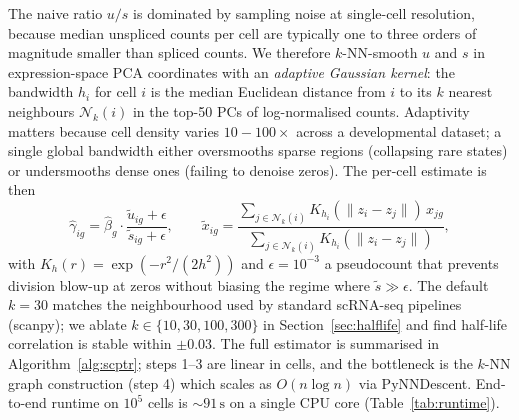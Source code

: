\documentclass{article}
\begin{document}
The naive ratio $u/s$ is dominated by sampling noise at single-cell resolution, because median unspliced counts per cell are typically one to three orders of magnitude smaller than spliced counts. We therefore $k$-NN-smooth $u$ and $s$ in expression-space PCA coordinates with an \textit{adaptive Gaussian kernel}: the bandwidth $h_i$ for cell $i$ is the median Euclidean distance from $i$ to its $k$ nearest neighbours $\mathcal{N}_k(i)$ in the top-50 PCs of log-normalised counts. Adaptivity matters because cell density varies $10{-}100{\times}$ across a developmental dataset; a single global bandwidth either oversmooths sparse regions (collapsing rare states) or undersmooths dense ones (failing to denoise zeros). The per-cell estimate is then
\begin{equation}
  \widehat{\gamma}_{ig} = \widehat{\beta}_g \cdot \frac{\widetilde{u}_{ig} + \epsilon}{\widetilde{s}_{ig} + \epsilon}, \qquad \widetilde{x}_{ig} = \frac{\sum_{j \in \mathcal{N}_k(i)} K_{h_i}(\|z_i - z_j\|)\, x_{jg}}{\sum_{j \in \mathcal{N}_k(i)} K_{h_i}(\|z_i - z_j\|)},
  \label{eq:gamma}
\end{equation}
with $K_h(r){=}\exp(-r^2/(2h^2))$ and $\epsilon{=}10^{-3}$ a pseudocount that prevents division blow-up at zeros without biasing the regime where $\widetilde{s} \gg \epsilon$. The default $k{=}30$ matches the neighbourhood used by standard scRNA-seq pipelines (scanpy); we ablate $k \in \{10, 30, 100, 300\}$ in Section~\ref{sec:halflife} and find half-life correlation is stable within $\pm0.03$. The full estimator is summarised in Algorithm~\ref{alg:scptr}; steps 1--3 are linear in cells, and the bottleneck is the $k$-NN graph construction (step 4) which scales as $O(n\log n)$ via PyNNDescent. End-to-end runtime on $10^5$ cells is ${\sim}91\,\text{s}$ on a single CPU core (Table~\ref{tab:runtime}).
\end{document}
